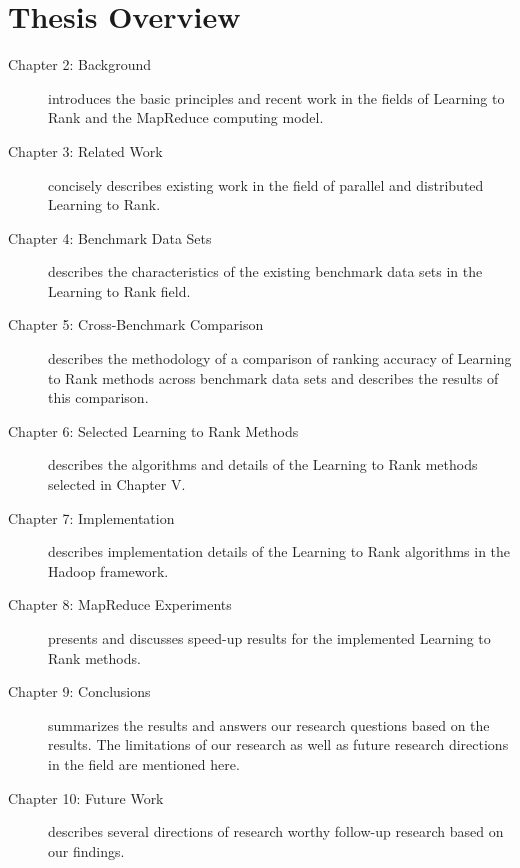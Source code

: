 \section{Thesis Overview}
\begin{description}
\item[Chapter 2: Background]{introduces the basic principles and recent work in the fields of Learning to Rank and the MapReduce computing model.}
\item[Chapter 3: Related Work]{concisely describes existing work in the field of parallel and distributed Learning to Rank.}
\item[Chapter 4: Benchmark Data Sets]{describes the characteristics of the existing benchmark data sets in the Learning to Rank field.}
\item[Chapter 5: Cross-Benchmark Comparison]{describes the methodology of a comparison of ranking accuracy of Learning to Rank methods across benchmark data sets and describes the results of this comparison.}
\item[Chapter 6: Selected Learning to Rank Methods]{describes the algorithms and details of the Learning to Rank methods selected in Chapter V.}
\item[Chapter 7: Implementation]{describes implementation details of the Learning to Rank algorithms in the Hadoop framework.}
\item[Chapter 8: MapReduce Experiments]{presents and discusses speed-up results for the implemented Learning to Rank methods.}
\item[Chapter 9: Conclusions]{summarizes the results and answers our research questions based on the results. The limitations of our research as well as future research directions in the field are mentioned here.}
\item[Chapter 10: Future Work]{describes several directions of research worthy follow-up research based on our findings.}
\end{description}